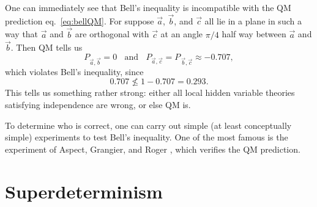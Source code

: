 One can immediately see that Bell's inequality is incompatible with
the QM prediction eq.~\eqref{eq:bellQM}. For suppose $\vec{a}$, $\vec{b}$,
and $\vec{c}$ all lie in a plane in such a way that $\vec{a}$ and $\vec{b}$
are orthogonal with $\vec{c}$ at an angle $\pi/4$ half way between
$\vec{a}$ and $\vec{b}$. Then QM tells us
\begin{equation}
  P_{\vec{a},\vec{b}}=0~~~~\text{and}~~~~
  P_{\vec{a},\vec{c}}=P_{\,\vec{b},\vec{c}}\approx-0.707,
\end{equation}
which violates Bell's inequality, since
\begin{equation}
  0.707\nleq1-0.707=0.293.
\end{equation}
This tells us something rather strong: either all local hidden variable 
theories satisfying independence are wrong, or else QM is.

To determine who is correct, one can carry out simple (at least conceptually
simple) experiments to test Bell's inequality. One of the most famous
is the experiment of Aspect, Grangier, and Roger
\cite{}, which verifies the QM prediction. 


\section{Superdeterminism}\label{sec:superdeterminism}




